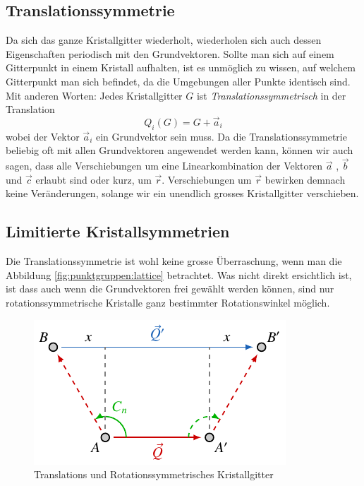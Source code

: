 
\subsection{Translationssymmetrie}
Da sich das ganze Kristallgitter wiederholt, wiederholen sich auch dessen Eigenschaften periodisch mit den Grundvektoren.
Sollte man sich auf einem Gitterpunkt in einem Kristall aufhalten, ist es unmöglich zu wissen, auf welchem Gitterpunkt man sich befindet, 
da die Umgebungen aller Punkte identisch sind. 
Mit anderen Worten: Jedes Kristallgitter $ G $ ist \emph{Translationssymmetrisch} in der Translation 
\[
    Q_i(G) = G + \vec{a}_i
\] wobei der Vektor $\vec{a}_i$ ein Grundvektor sein muss.
Da die Translationssymmetrie beliebig oft mit allen Grundvektoren angewendet werden kann, 
können wir auch sagen, dass alle Verschiebungen um eine Linearkombination 
der Vektoren $\vec{a}$ , $\vec{b}$ und $\vec{c}$ erlaubt sind oder kurz, um $\vec{r}$. 
Verschiebungen um $\vec{r}$ bewirken demnach keine Veränderungen, 
solange wir ein unendlich grosses Kristallgitter verschieben.

\subsection{Limitierte Kristallsymmetrien}
 Die Translationssymmetrie ist wohl keine grosse Überraschung, wenn man die Abbildung \ref{fig:punktgruppen:lattice} betrachtet.
 Was nicht direkt ersichtlich ist, ist dass auch wenn die Grundvektoren frei gewählt werden können, 
 sind nur rotationssymmetrische Kristalle ganz bestimmter Rotationswinkel möglich.

\begin{figure}
    \centering
    \includegraphics[]{papers/punktgruppen/figures/combine-symmetries}
    \caption{
        Translations und Rotationssymmetrisches Kristallgitter
    }
    \label{fig:punktgruppen:rot-geometry}
\end{figure}

